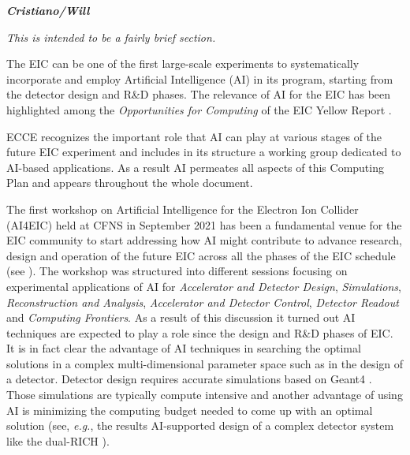 \textbf{\emph{Cristiano/Will}}

\emph{This is intended to be a fairly brief section. %
}



The EIC can be one of the first large-scale experiments to systematically incorporate and employ Artificial Intelligence (AI) in its program, starting from the detector design and R\&D phases. 
The relevance of AI for the EIC has been highlighted among the \textit{Opportunities for Computing} of the EIC Yellow Report \cite{eic_yellow_report_v1_1}.

ECCE recognizes the important role that AI can play at various stages of the future EIC experiment and includes in its structure a working group dedicated to AI-based applications. 
As a result AI permeates all aspects of this Computing Plan and appears throughout the whole document.

The first workshop on Artificial Intelligence for the Electron Ion Collider (AI4EIC) held at CFNS in September 2021 \cite{AI4EIC_workshop} has been a fundamental venue for the EIC community to start addressing how AI might contribute to advance research, design and operation of the future EIC across all the phases of the EIC schedule (see \cite{AI4EIC_future}).
The workshop was structured into different sessions focusing on experimental applications of AI for \textit{Accelerator and Detector Design}, \textit{Simulations}, \textit{Reconstruction and Analysis}, \textit{Accelerator and Detector Control}, \textit{Detector Readout} and \textit{Computing Frontiers}. 
%
As a result of this discussion it turned out AI techniques are expected to play a role since the design and R\&D phases of EIC. 
It is in fact clear the advantage of AI techniques in searching the optimal solutions in a complex multi-dimensional parameter space such as in the design of a detector. Detector design requires accurate simulations based on Geant4 \cite{ALLISON2016186}. Those simulations are typically compute intensive and another advantage of using AI is minimizing the computing budget needed to come up with an optimal solution (see, \textit{e.g.}, the results AI-supported design of a complex detector system like the dual-RICH \cite{cisbani2020ai}).


